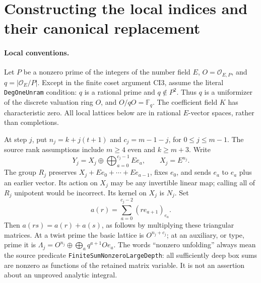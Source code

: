 \section{Constructing the local indices and their canonical replacement}
\label{sec:canonical-indices}


\paragraph{Local conventions.}
Let $P$ be a nonzero prime of the integers of the number field $E$,
$O=\mathcal O_{E,P}$, and $q=|\mathcal O_E/P|$. Except in the finite
coset argument CI3, assume the literal \texttt{DegOneUnram} condition:
$q$ is a rational prime and $q\notin P^2$. Thus $q$ is a uniformizer
of the discrete valuation ring $O$, and $O/qO=\mathbb F_q$. The
coefficient field $K$ has characteristic zero. All local lattices below
are in rational $E$-vector spaces, rather than completions.

At step $j$, put $n_j=k+j(t+1)$ and $c_j=m-1-j$, for
$0\le j\le m-1$. The source rank assumptions include $m\ge4$ even
and $k\ge m+3$. Write
\[
 Y_j=X_j\oplus\bigoplus_{a=0}^{c_j-1}Ee_a,
 \qquad X_j=E^{n_j}.
 \tag{CI.1}
\]
The group $R_j$ preserves $X_j+Ee_0+\cdots+Ee_{a-1}$,
fixes $e_0$, and sends $e_a$ to $e_a$ plus an earlier vector.
Its action on $X_j$ may be any invertible linear map; calling
all of $R_j$ unipotent would be incorrect. Its kernel on $X_j$ is
$N_j$. Set
\[
 a(r)=\sum_{a=0}^{c_j-2}(r e_{a+1})_{e_a}.
 \tag{CI.2}
\]
Then $a(rs)=a(r)+a(s)$, as follows by multiplying these triangular
matrices. At a twist prime the basic lattice is $O^{n_j+c_j}$;
at an auxiliary, or type, prime it is
$\Lambda_j=O^{n_j}\oplus\bigoplus_a q^{a+1}Oe_a$.
The words ``nonzero unfolding'' always mean the source predicate
\texttt{FiniteSumNonzeroLargeDepth}: all sufficiently deep box sums
are nonzero as functions of the retained matrix variable. It is not
an assertion about an unproved analytic integral.

